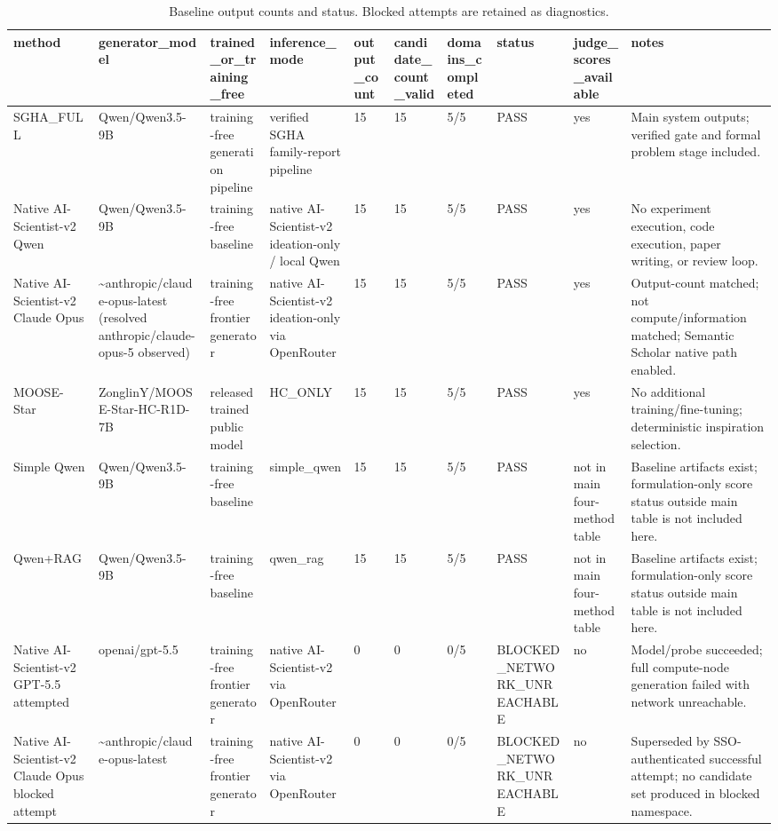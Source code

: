 \begin{table}[htbp]
\centering
\caption{Baseline output counts and status. Blocked attempts are retained as diagnostics.}
\label{tab:baseline\_counts\_status}
\begin{tabular}{llllllllll}
\toprule
method & generator\_model & trained\_or\_training\_free & inference\_mode & output\_count & candidate\_count\_valid & domains\_completed & status & judge\_scores\_available & notes \\
\midrule
SGHA\_FULL & Qwen/Qwen3.5-9B & training-free generation pipeline & verified SGHA family-report pipeline & 15 & 15 & 5/5 & PASS & yes & Main system outputs; verified gate and formal problem stage included. \\
Native AI-Scientist-v2 Qwen & Qwen/Qwen3.5-9B & training-free baseline & native AI-Scientist-v2 ideation-only / local Qwen & 15 & 15 & 5/5 & PASS & yes & No experiment execution, code execution, paper writing, or review loop. \\
Native AI-Scientist-v2 Claude Opus & \textasciitilde{}anthropic/claude-opus-latest (resolved anthropic/claude-opus-5 observed) & training-free frontier generator & native AI-Scientist-v2 ideation-only via OpenRouter & 15 & 15 & 5/5 & PASS & yes & Output-count matched; not compute/information matched; Semantic Scholar native path enabled. \\
MOOSE-Star & ZonglinY/MOOSE-Star-HC-R1D-7B & released trained public model & HC\_ONLY & 15 & 15 & 5/5 & PASS & yes & No additional training/fine-tuning; deterministic inspiration selection. \\
Simple Qwen & Qwen/Qwen3.5-9B & training-free baseline & simple\_qwen & 15 & 15 & 5/5 & PASS & not in main four-method table & Baseline artifacts exist; formulation-only score status outside main table is not included here. \\
Qwen+RAG & Qwen/Qwen3.5-9B & training-free baseline & qwen\_rag & 15 & 15 & 5/5 & PASS & not in main four-method table & Baseline artifacts exist; formulation-only score status outside main table is not included here. \\
Native AI-Scientist-v2 GPT-5.5 attempted & openai/gpt-5.5 & training-free frontier generator & native AI-Scientist-v2 via OpenRouter & 0 & 0 & 0/5 & BLOCKED\_NETWORK\_UNREACHABLE & no & Model/probe succeeded; full compute-node generation failed with network unreachable. \\
Native AI-Scientist-v2 Claude Opus blocked attempt & \textasciitilde{}anthropic/claude-opus-latest & training-free frontier generator & native AI-Scientist-v2 via OpenRouter & 0 & 0 & 0/5 & BLOCKED\_NETWORK\_UNREACHABLE & no & Superseded by SSO-authenticated successful attempt; no candidate set produced in blocked namespace. \\
\bottomrule
\end{tabular}
\end{table}

